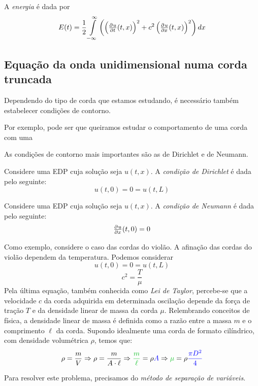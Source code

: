 \documentclass[11pt,twoside,a4paper]{book}
\begin{document}
\begin{definicao}
A \emph{energia} é dada por
\[
E(t) = \frac{1}{2} \int\limits_{-\infty}^\infty \left( \left(   \pd{u}{t}(t,x)\right)^2 + c^2\left(   \pd{u}{x}(t,x)\right)^2 \right) dx
\]
\end{definicao}

\subsection{Equação da onda unidimensional numa corda truncada}

\noindent
Dependendo do tipo de corda que estamos estudando, é necessário também estabelecer condições de contorno.

\medskip
\noindent
Por exemplo, pode ser que queiramos estudar o comportamento de uma corda com uma

\medskip
\noindent
As condições de contorno mais importantes são as de Dirichlet e de Neumann. 

\begin{definicao}
Considere uma EDP cuja solução seja $u(t,x).$ A \textit{condição de Dirichlet} é dada pelo seguinte:
\[u(t,0) = 0 = u(t,L) 
\]
\end{definicao}
\begin{definicao}
Considere uma EDP cuja solução seja $u(t,x).$ A \textit{condição de Neumann} é dada pelo seguinte:
\[\pd{u}{x}(t,0) = 0
\]
\end{definicao}

\noindent
Como exemplo, considere o caso das cordas do violão. A afinação das cordas do violão dependem da temperatura. Podemos considerar
\[
u(t,0) = 0 = u(t,L) 
\]
\[
c^2 = \frac{T}{\mu}
\]
Pela última equação, também conhecida como \emph{Lei de Taylor}, percebe-se que a velocidade $c$ da corda adquirida em determinada oscilação depende da força de tração $T$ e da densidade linear de massa da corda $\mu$. Relembrando conceitos de física, a densidade linear de massa é definida como a razão entre a massa $m$ e o comprimento $\ell$ da corda. Supondo idealmente uma corda de formato cilíndrico, com densidade volumétrica $\rho$, temos que:
\[
\rho = \frac{m}{V} \Rightarrow \rho = \frac{m}{A \cdot \ell} \Rightarrow \textcolor{Verdeest}{\frac{m}{\ell}} = \rho \textcolor{blue}{A} \Rightarrow
\textcolor{Verdeest}{\mu} = \rho \textcolor{blue}{\frac{\pi D^2}{4}}
\]

\noindent
Para resolver este problema, precisamos do \emph{método de separação de variáveis}.
\end{document}
